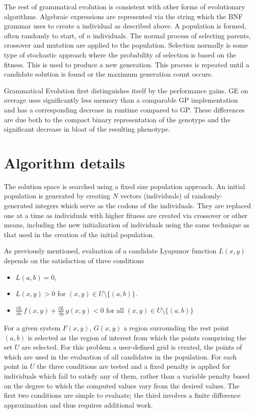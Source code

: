 \documentclass[12pt]{article}
\begin{document}
The rest of grammatical evolution is consistent with other forms of
evolutionary algorithms.  Algebraic expressions are represented via
the string which the BNF grammar uses to create a individual as
described above.  A population is formed, often randomly to start, of
$n$ individuals.  The normal process of selecting parents, crossover
and mutation are applied to the population.  Selection normally is
some type of stochastic approach where the probability of selection is
based on the fitness.   This is used to produce a
new generation.  This process is repeated until a candidate solution
is found or the maximum generation count occurs.

Grammatical Evolution first distinguishes itself by the performance
gains.  GE on average uses significantly less memory than a comparable
GP implementation and has a corresponding decrease in runtime compared to GP.  
These differences are due both to the compact binary representation of the
genotype and the significant decrease in bloat of the resulting phenotype.


\section{Algorithm details}


The solution space is searched using a fixed size population
approach. An initial population is generated by creating $N$ vectors
(individuals) of randomly-generated integers which serve as the codons
of the individuals.   They
are replaced one at a time as individuals with higher fitness are
created via crossover or other means, including the new initialization
of individuals using the same technique as that used in the creation
of the initial population.

As previously mentioned, evaluation of a candidate Lyapunov function $L(x,y)$
depends on the satisfaction of three conditions
\begin{itemize}
\item $L(a,b) = 0$,
\item  $L(x,y) > 0$ for $(x,y) \in U\setminus \{(a,b)\}$.
\item $\displaystyle \frac{\partial L}{\partial x}\, f(x,y) 
+ \frac{\partial L}{\partial y}\, g(x,y) < 0$ for all $(x,y) \in
U\setminus \{(a,b)\}$
\end{itemize}

For a given system $F(x,y)$, $G(x,y)$ a region surrounding the rest
point $(a,b)$ is selected as the region of interest from which the
points comprising the set $U$ are selected. For this problem a
user-defined grid is created, the points of which are used in the
evaluation of all candidates in the population. For each point in $U$
the three conditions are tested and a fixed penalty is applied for
individuals which fail to satisfy any of them, rather than a variable
penalty based on the degree to which the computed values vary from the
desired values.  The first two conditions are simple to evaluate; the
third involves a finite difference approximation and thus requires
additional work.
\end{document}
